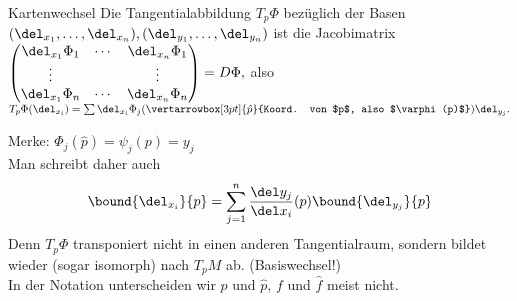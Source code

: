 \begin{rem}
	Kartenwechsel
	Die Tangentialabbildung $T_p\Phi$ bezüglich der Basen $ (\del_{x_1},\dotsc, \del_{x_n}),(\del_{y_1},\dotsc,\del_{y_n}) $ ist die Jacobimatrix $ \begin{pmatrix}
		\del_{x_1} \Phi_1 & \cdots & \del_{x_n}\Phi_1\\
		\vdots & &\vdots\\
		\del_{x_1}\Phi_n & \cdots & \del_{x_n}\Phi_n
	\end{pmatrix} = D\Phi, $ also $ T_p\Phi(\del_{x_i}) = \sum \del_{x_i}\Phi_j ({\vertarrowbox[3pt]{\hat{p}}{Koord. von $p$, also $\varphi(p)$}}) \del_{y_j}. $
\end{rem}

Merke: $ \Phi_j(\hat{p}) = \psi_j(p) = y_j $\\
Man schreibt daher auch
\[ \bound{\del_{x_i}}{p} = \sum_{j=1}^{n} \frac{\del y_j}{\del x_i}(p) \bound{\del_{y_j}}{p} \]
Denn $T_p\Phi$ transponiert nicht in einen anderen Tangentialraum, sondern bildet wieder (sogar isomorph) nach $T_pM$ ab. (Basiswechsel!)\\
In der Notation unterscheiden wir $p$ und $\hat{p}$, $f$ und $\hat{f}$ meist nicht.

